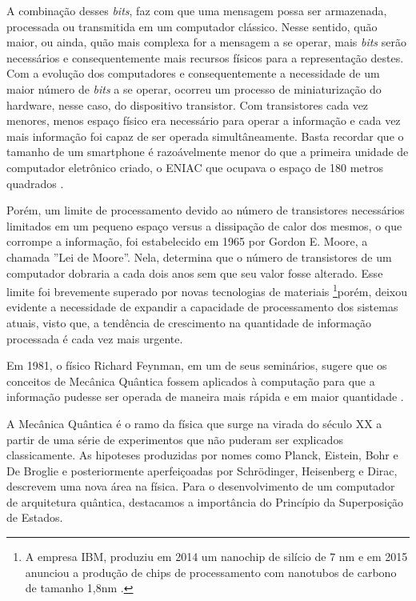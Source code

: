 \documentclass[11pt,oneside,brazil,hidelinks,article,sumario=tradicional,a4paper]{abntex2}
\begin{document}
A combinação desses \textit{bits}, faz com que uma mensagem possa ser armazenada, processada ou transmitida em um computador clássico. Nesse sentido, quão maior, ou ainda, quão mais complexa for a mensagem a se operar, mais \textit{bits} serão necessários e consequentemente mais recursos físicos para a representação destes. Com a evolução dos computadores e consequentemente a necessidade de um maior número de \textit{bits} a se operar, ocorreu um processo de miniaturização do hardware, nesse caso, do dispositivo transistor.
Com transistores cada vez menores, menos espaço físico era necessário para operar a informação e cada vez mais informação foi capaz de ser operada simultâneamente. Basta recordar que o tamanho de um smartphone é razoávelmente menor do que a primeira unidade de computador eletrônico criado, o ENIAC que ocupava o espaço de 180 metros quadrados \cite{eniac}.

Porém, um limite de processamento devido ao número de transistores necessários limitados em um pequeno espaço versus a dissipação de calor dos mesmos, o que corrompe a informação, foi estabelecido em 1965 por Gordon E. Moore, a chamada ''Lei de Moore''. Nela, \textcite{moore} determina que o número de transistores de um computador dobraria a cada dois anos sem que seu valor fosse alterado. Esse limite foi brevemente superado por novas tecnologias de materiais \footnote{A empresa IBM, produziu em 2014 um nanochip de silício de 7 nm e em 2015 anunciou a produção de chips de processamento com nanotubos de carbono de tamanho 1,8nm \cite{chipibm}.}porém, deixou evidente a necessidade de expandir a capacidade de processamento dos sistemas atuais, visto que, a tendência de crescimento na quantidade de informação processada é cada vez mais urgente.

Em 1981, o físico Richard Feynman, em um de seus seminários, sugere que os conceitos de Mecânica Quântica fossem aplicados à computação para que a informação pudesse ser operada de maneira mais rápida e em maior quantidade \cite{TeoQuanInfoEntreCopia}. 

A Mecânica Quântica é o ramo da física que surge na virada do século XX a partir de uma série de experimentos que não puderam ser explicados classicamente. As hipoteses produzidas por nomes como Planck, Eistein, Bohr e De Broglie e posteriormente aperfeiçoadas por Schrödinger, Heisenberg e Dirac, descrevem uma nova área na física. Para o desenvolvimento de um computador de arquitetura quântica, destacamos a importância do Princípio da Superposição de Estados.
\end{document}
